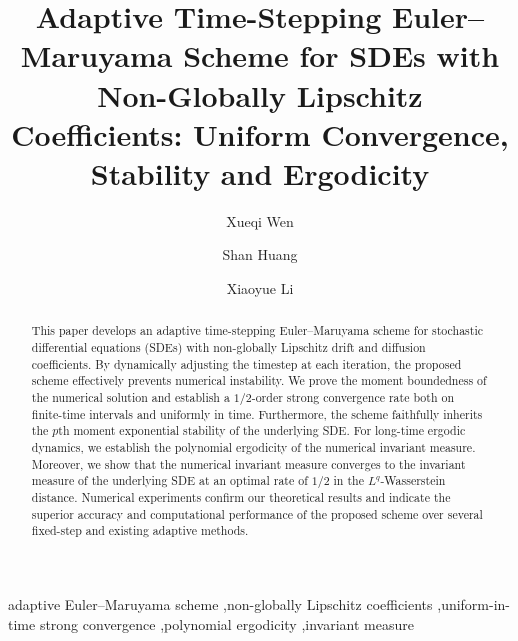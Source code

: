 \documentclass[preprint,12pt,compress]{elsarticle}
\begin{document}
\begin{frontmatter}
	\title{
	Adaptive Time-Stepping Euler--Maruyama Scheme for SDEs with Non-Globally Lipschitz Coefficients: Uniform Convergence, Stability and Ergodicity
    }

\author[aff1]{Xueqi Wen}
\author[aff2]{Shan Huang}
\author[aff1]{Xiaoyue Li}


\address[aff1]{School of Mathematical Sciences,
	Tiangong University, Tianjin 300387, China}

\address[aff2]{School of Mathematics and Statistics,
	Northeast Normal University, Changchun, Jilin 130024, China}



    
	
	
\begin{abstract}
This paper develops an adaptive time-stepping Euler--Maruyama scheme for stochastic differential equations (SDEs) with non-globally Lipschitz drift and diffusion coefficients. By dynamically adjusting the timestep at each iteration, the proposed scheme effectively prevents numerical instability.
We prove the moment boundedness of the numerical solution and establish a $1/2$-order strong convergence rate both on finite-time intervals and uniformly in time. Furthermore, the scheme faithfully inherits the $p$th moment exponential stability of the underlying SDE. For long-time ergodic dynamics, we establish the polynomial ergodicity of the numerical invariant measure. Moreover, we show that the numerical invariant measure converges to the invariant measure of the underlying SDE at an optimal rate of $1/2$ in the $L^q$-Wasserstein distance. 
Numerical experiments confirm our theoretical results and indicate the superior accuracy and computational performance of the proposed scheme over several fixed-step and existing adaptive methods.

	
 \end{abstract}
	
	\begin{keyword}
		adaptive Euler--Maruyama scheme \sep non-globally Lipschitz coefficients \sep uniform-in-time strong convergence \sep polynomial ergodicity \sep invariant measure 
		 
	\end{keyword}
	
\end{frontmatter}
\end{document}
